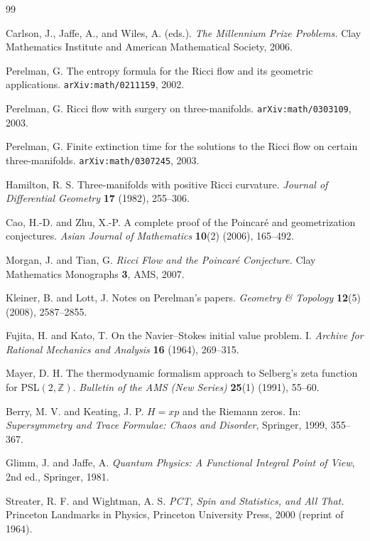 \documentclass[11pt,a4paper]{article}
\theoremstyle{definition}
\begin{document}
\begin{thebibliography}{99}

 Carlson, J., Jaffe, A., and Wiles, A.
(eds.). \emph{The Millennium Prize Problems.} Clay Mathematics
Institute and American Mathematical Society, 2006.

 Perelman, G. The entropy formula for the
Ricci flow and its geometric applications. \texttt{arXiv:math/0211159},
2002.

 Perelman, G. Ricci flow with surgery on
three-manifolds. \texttt{arXiv:math/0303109}, 2003.

 Perelman, G. Finite extinction time for the
solutions to the Ricci flow on certain three-manifolds.
\texttt{arXiv:math/0307245}, 2003.

 Hamilton, R. S. Three-manifolds with positive
Ricci curvature. \emph{Journal of Differential Geometry} \textbf{17}
(1982), 255--306.

 Cao, H.-D. and Zhu, X.-P. A complete proof of
the Poincar\'e and geometrization conjectures. \emph{Asian Journal
of Mathematics} \textbf{10}(2) (2006), 165--492.

 Morgan, J. and Tian, G. \emph{Ricci Flow
and the Poincar\'e Conjecture.} Clay Mathematics Monographs
\textbf{3}, AMS, 2007.

 Kleiner, B. and Lott, J. Notes on
Perelman's papers. \emph{Geometry \& Topology} \textbf{12}(5)
(2008), 2587--2855.

 Fujita, H. and Kato, T. On the
Navier--Stokes initial value problem. I. \emph{Archive for Rational
Mechanics and Analysis} \textbf{16} (1964), 269--315.

 Mayer, D. H. The thermodynamic formalism approach
to Selberg's zeta function for PSL$(2,\mathbb{Z})$. \emph{Bulletin
of the AMS (New Series)} \textbf{25}(1) (1991), 55--60.

 Berry, M. V. and Keating, J. P. $H = xp$
and the Riemann zeros. In: \emph{Supersymmetry and Trace Formulae:
Chaos and Disorder}, Springer, 1999, 355--367.

 Glimm, J. and Jaffe, A. \emph{Quantum
Physics: A Functional Integral Point of View}, 2nd ed., Springer,
1981.

 Streater, R. F. and Wightman, A. S.
\emph{PCT, Spin and Statistics, and All That.} Princeton Landmarks
in Physics, Princeton University Press, 2000 (reprint of 1964).


\end{thebibliography}
\end{document}
